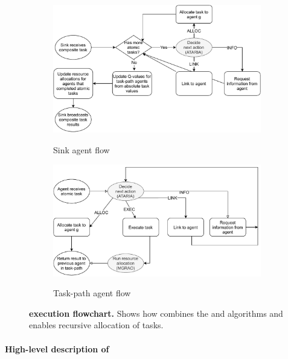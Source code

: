 \begin{figure}[ht]
	\centering
	\begin{subfigure}{0.75\textwidth}
		\centering
		\caption{Sink agent flow}
		\includegraphics[width=0.9\linewidth, trim={25pt 0pt 25pt 0pt, clip}]{algorithm-flow-sink}
		\label{fig:algorithm-flow-sink}
	\end{subfigure} \hfill%
	\begin{subfigure}{0.75\textwidth}
		\caption{Task-path agent flow}
		\centering	\includegraphics[width=0.9\linewidth,trim={25pt 0pt 25pt 0pt, clip}]{algorithm-flow-arc}
		\label{fig:algorithm-flow-arc}
	\end{subfigure}
	\caption{\textbf{\acronymWSNOptimisation{}{} execution flowchart.} Shows how \acronymWSNOptimisation{}{} combines the \acronymATARIA{}{} and \acronymMGRAO{}{} algorithms and enables recursive allocation of tasks.}
	\label{fig:algorithm-flow}
\end{figure}

\paragraph{High-level description of  \acronymWSNOptimisation{}{}}

